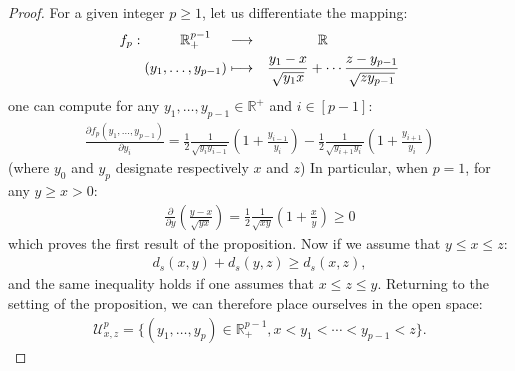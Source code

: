 \documentclass[a4papaer, titlepage]{book}
\begin{document}
\begin{proof}%
   For a given integer $p \geq 1$, let us differentiate the mapping:
   \begin{align*}
     f_p : \begin{aligned}[t]
       \mathbb R_+^{p-1}\hspace{0.4cm}& \longrightarrow&\mathbb R \hspace{1.8cm}\\
       (y_1,\ldots, y_{p-1})&\longmapsto&\frac{y_1-x}{\sqrt{y_1x}} + \cdots  \frac{z-y_{p-1}}{\sqrt{zy_{p-1}}}
     \end{aligned}
   \end{align*}
   one can compute for any $y_1,\ldots, y_{p-1} \in \mathbb R^+$ and $i \in [p-1]$:
   \begin{align}\label{eq:differentielle_f_p_triangulaire}
     \frac{\partial f_p(y_1,\ldots, y_{p-1})}{\partial y_i} = \frac{1}{2} \frac{1}{\sqrt{y_i y_{i-1}}} \left(1+ \frac{y_{i-1}}{y_i}\right) -\frac{1}{2} \frac{1}{\sqrt{y_{i+1} y_{i}}} \left(1+ \frac{y_{i+1}}{y_{i}}\right) 
   \end{align}
   (where $y_0$ and $y_{p}$ designate respectively $x$ and $z$)
   In particular, when $p=1$, for any $y\geq x >0$:
   \begin{align*}
     \frac{\partial }{\partial y} \left(\frac{y-x}{\sqrt{yx}}\right) = \frac{1}{2} \frac{1}{\sqrt{xy}} \left(1+\frac{x}{y}\right) \geq 0
   \end{align*}
   which proves the first result of the proposition. 
   Now if we assume that $y \leq x \leq z$:
   \begin{align*}
     d_s(x,y) + d_s(y,z) \geq d_s(x,z),
   \end{align*}
   and the same inequality holds if one assumes that $x\leq z \leq y$. Returning to the setting of the proposition, we can therefore place ourselves in the open space:
   \begin{align*}
     \mathcal U^p_{x,z} = \{(y_1,\ldots, y_p) \in \mathbb R^{p-1}_+,x < y_1 < \cdots < y_{p-1} < z\}.
   \end{align*}


\end{proof}
\end{document}
